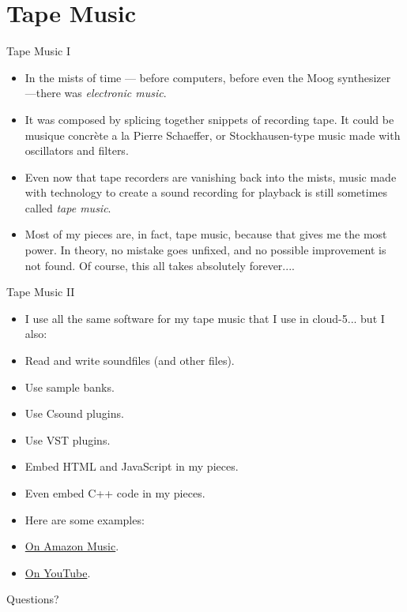 \documentclass{beamer}
\begin{document}
\section{Tape Music}
\begin{frame}{Tape Music I}

\begin{itemize}
\item In the mists of time --- before computers, before even the Moog synthesizer ---there was \emph{electronic music}.
\item It was composed by splicing together snippets of recording tape. It could be musique concrète a la Pierre Schaeffer, or Stockhausen-type music made with oscillators and filters.
\item Even now that tape recorders are vanishing back into the mists, music made with technology to create a sound recording for playback is still sometimes called \emph{tape music}.
\item Most of my pieces are, in fact, tape music, because that gives me the most power. In theory, no mistake goes unfixed, and no possible improvement is not found. Of course, this all takes absolutely forever....
\end{itemize}
\end{frame}

\begin{frame}{Tape Music II}

\begin{itemize}
\item I use all the same software for my tape music that I use in cloud-5... but I also:
\item Read and write soundfiles (and other files).
\item Use sample banks.
\item Use Csound plugins.
\item Use VST plugins.
\item Embed HTML and JavaScript in my pieces.
\item Even embed C++ code in my pieces.
\item Here are some examples: 
\item \href{https://music.amazon.com/artists/B0016KQMPA/michael-gogins}{On Amazon Music}.
\item \href{https://www.youtube.com/@michaelgogins}{On YouTube}.
\end{itemize}

\end{frame}

\begin{frame}{Questions?}

\end{frame}
\end{document}
